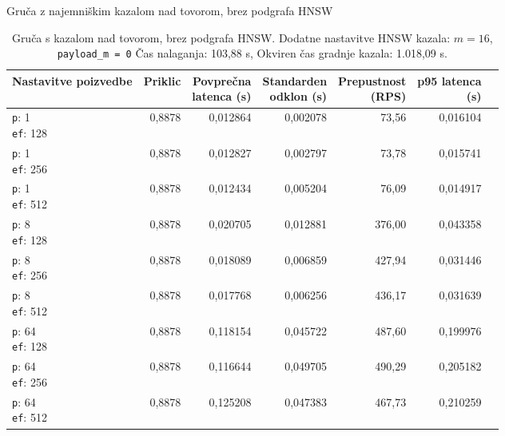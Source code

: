 \begin{table}[htbp]
  \centering
\small
  \caption{Gruča z najemniškim kazalom nad tovorom, brez podgrafa HNSW}
  \label{tab:cluster-2cpu-4ram:tenant-no-subgraph:qdrant-dipl-baseline-tenant-no-subgraph-2-m-16-ef-128-random-768-100-tenants-extended-upload-2026-08-17-19-37-36.json}
  \begin{tabularx}{\textwidth}{Xrrrrrr}
    \toprule
    Nastavitve poizvedbe & Priklic & \makecell{Povprečna\\latenca (s)} & \makecell{Standarden\\odklon (s)} & \makecell{Prepustnost\\(RPS)} & \makecell{p95 latenca\\(s)}  \\
    \midrule
    \makecell{\texttt{p}: 1\\\texttt{ef}: 128} & 0,8878 & 0,012864 & 0,002078 & 73,56 & 0,016104 \\
    \makecell{\texttt{p}: 1\\\texttt{ef}: 256} & 0,8878 & 0,012827 & 0,002797 & 73,78 & 0,015741 \\
    \makecell{\texttt{p}: 1\\\texttt{ef}: 512} & 0,8878 & 0,012434 & 0,005204 & 76,09 & 0,014917 \\
    \makecell{\texttt{p}: 8\\\texttt{ef}: 128} & 0,8878 & 0,020705 & 0,012881 & 376,00 & 0,043358 \\
    \makecell{\texttt{p}: 8\\\texttt{ef}: 256} & 0,8878 & 0,018089 & 0,006859 & 427,94 & 0,031446 \\
    \makecell{\texttt{p}: 8\\\texttt{ef}: 512} & 0,8878 & 0,017768 & 0,006256 & 436,17 & 0,031639 \\
    \makecell{\texttt{p}: 64\\\texttt{ef}: 128} & 0,8878 & 0,118154 & 0,045722 & 487,60 & 0,199976 \\
    \makecell{\texttt{p}: 64\\\texttt{ef}: 256} & 0,8878 & 0,116644 & 0,049705 & 490,29 & 0,205182 \\
    \makecell{\texttt{p}: 64\\\texttt{ef}: 512} & 0,8878 & 0,125208 & 0,047383 & 467,73 & 0,210259 \\
    \bottomrule
  \end{tabularx}
\caption* {Gruča s kazalom nad tovorom, brez podgrafa HNSW. Dodatne nastavitve HNSW kazala: $m = 16$, \texttt{payload\_m = 0} Čas nalaganja: 103,88 s, Okviren čas gradnje kazala: 1.018,09 s.}\end{table}


